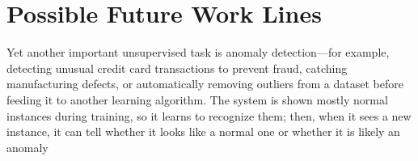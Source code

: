\documentclass[12pt, a4paper]{article}
\begin{document}
	
	\clearpage
	
	\section{Possible Future Work Lines}
	
	Yet another important unsupervised task is anomaly detection—for example, detecting unusual credit card transactions to prevent fraud, catching manufacturing defects, or automatically removing outliers from a dataset before feeding it to another learning algorithm. The system is shown mostly normal instances during training, so it learns to recognize them; then, when it sees a new instance, it can tell whether it looks like a normal one or whether it is likely an anomaly
	
	\clearpage
	
	
	
	
	
\end{document}
